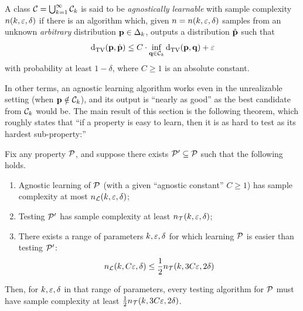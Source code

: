 \begin{definition}
	A class $\mathcal{C}=\bigcup_{k=1}^\infty \mathcal{C}_k$ is said to be \emph{agnostically learnable} with sample complexity $n(k,\varepsilon,\delta)$ if there is an algorithm which, given $n=n(k,\varepsilon,\delta)$ \iid samples from an unknown \emph{arbitrary} distribution $\mathbf{p}\in\Delta_{k}$, outputs a distribution $\hat{\mathbf{p}}$ such that
	\[
		\totalvardist{\p}{\hat{\p}} \leq C\cdot \inf_{\q\in\class_\ab} \totalvardist{\p}{\q} + \dst
	\]
with probability at least $1-\delta$, where $C\geq 1$ is an absolute constant.
\end{definition}
In other terms, an agnostic learning algorithm works even in the unrealizable setting (when $\mathbf{p}\notin\mathcal{C}_k$), and its output is ``nearly as good'' as the best candidate from $\mathcal{C}_k$ would be. The main result of this section is the following theorem, which roughly states that ``if a property is easy to learn, then it is as hard to test as its hardest sub-property:''
\begin{theorem}
	\label{theo:hardness:subclass}
  Fix any property $\mathcal{P}$, and suppose there exists $\mathcal{P}'\subseteq \mathcal{P}$ such that the following holds.
  \begin{enumerate}
    \item\label{theo:hardness:subclass:item1} Agnostic learning of $\mathcal{P}$ (with a given ``agnostic constant'' $C\geq 1$) has sample complexity at most $n_{\mathcal{L}}(k,\varepsilon,\delta)$;
    \item\label{theo:hardness:subclass:item2} Testing $\mathcal{P}'$ has sample complexity at least $n_{\mathcal{T}}(k,\varepsilon,\delta)$;
    \item\label{theo:hardness:subclass:item3} There exists a range of parameters $k,\varepsilon,\delta$ for which learning $\mathcal{P}$ is easier than testing $\mathcal{P}'$: 
    	\[
    		n_{\mathcal{L}}(k,C\varepsilon,\delta) \leq \frac{1}{2}n_{\mathcal{T}}(k,3C\varepsilon,2\delta)
    	\]
  \end{enumerate}
  Then, for $k,\varepsilon,\delta$ in that range of parameters, every testing algorithm for $\mathcal{P}$ must have sample complexity at least $\frac{1}{2}n_{\mathcal{T}}(k,3C\varepsilon,2\delta)$.
\end{theorem}
